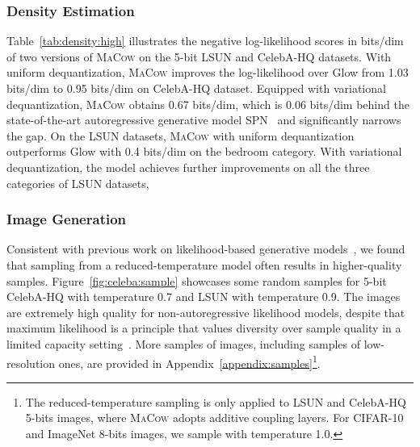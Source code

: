 \documentclass{article}
\begin{document}
\subsubsection{Density Estimation}
Table~\ref{tab:density:high} illustrates the negative log-likelihood scores in bits/dim of two versions of \textsc{MaCow} on the 5-bit  LSUN and  CelebA-HQ datasets.
With uniform dequantization, \textsc{MaCow} improves the log-likelihood over Glow from 1.03 bits/dim to 0.95 bits/dim on CelebA-HQ dataset. 
Equipped with variational dequantization, \textsc{MaCow} obtains 0.67 bits/dim, which is 0.06 bits/dim behind the state-of-the-art autoregressive generative model SPN~\citep{menick2018generating} and significantly narrows the gap. 
On the LSUN datasets, \textsc{MaCow} with uniform dequantization outperforms Glow with 0.4 bits/dim on the bedroom category.
With variational dequantization, the model achieves further improvements on all the three categories of LSUN datasets, 

\subsubsection{Image Generation}
Consistent with previous work on likelihood-based generative models~\citep{parmar2018image,kingma2018glow}, we found that sampling from a reduced-temperature model often results in higher-quality samples.
Figure~\ref{fig:celeba:sample} showcases some random samples for 5-bit CelebA-HQ  with temperature 0.7 and LSUN  with temperature 0.9.
The images are extremely high quality for non-autoregressive likelihood models, despite that maximum likelihood is a principle that values diversity over sample quality in a limited capacity setting~\citep{theis2016note}.
More samples of images, including samples of low-resolution ones, are provided in Appendix~\ref{appendix:samples}\footnote{The reduced-temperature sampling is only applied to LSUN and CelebA-HQ 5-bits images, where \textsc{MaCow} adopts additive coupling layers. For CIFAR-10 and ImageNet 8-bits images, we sample with temperature 1.0.}.
\end{document}
